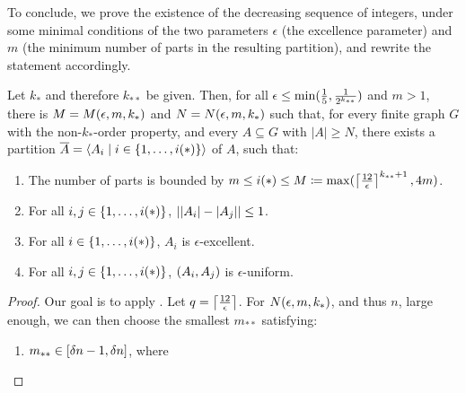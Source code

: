     To conclude, we prove the existence of the decreasing sequence of integers, under some minimal conditions
    of the two parameters $\epsilon$ (the excellence parameter) and $m$ (the minimum number of parts in the resulting
    partition), and rewrite the statement accordingly.

    \begin{theorem}[Theorem 5.18] \label{thm:minimal_conditions_for_excellent_partitions}
        Let $k_*$ and therefore $k_{**}$ be given.
        Then, for all $\epsilon \leq \min ( \frac{1}{5}, \frac{1}{2^{k_{**}}} )$ and $m > 1$, there is $M = M( \epsilon, m, k_* )$
        and $N = N( \epsilon, m, k_* )$ such that, for every finite graph $G$ with the non-$k_{*}$-order property, and
        every $A \subseteq G$ with $|A| \geq N$, there exists a partition $\overline{A} = \left< A_i \mid i \in \{ 1, \dots, i(*) \} \right>$
        of $A$, such that:
        \begin{enumerate}
            \item \label{itm:minimal_conditions_for_excellent_partitions.0} The number of parts is bounded by
                $m \leq i(*) \leq M \coloneqq \max ( \left\lceil \frac{12}{\epsilon} \right\rceil^{k_{**}+1}, 4m )$. 
            \item \label{itm:minimal_conditions_for_excellent_partitions.1} For all $i, j \in \{ 1, \dots, i(*) \}$, $| | A_i |- | A_j | | \leq 1$.
            \item \label{itm:minimal_conditions_for_excellent_partitions.2} For all $i \in \{ 1, \dots, i(*) \}$, $A_i$ is $\epsilon$-excellent.
            \item \label{itm:minimal_conditions_for_excellent_partitions.3} For all $i, j \in \{ 1, \dots, i(*) \}$, $( A_i, A_j )$ is $\epsilon$-uniform.  
        \end{enumerate}
        \begin{proof}
            Our goal is to apply .
            Let $q = \left\lceil \frac{12}{\epsilon} \right\rceil$.
            For $N( \epsilon, m, k_* )$, and thus $n$, large enough, we can then choose the smallest $m_{**}$ satisfying:
            \begin{enumerate}[label=(\alph*), ref=\alph*]
                \item \label{itm:minimal_conditions_for_excellent_partitions.a} $m_{**} \in [ \delta n -1, \delta n ]$, where

\end{enumerate}
\end{proof}
\end{theorem}
